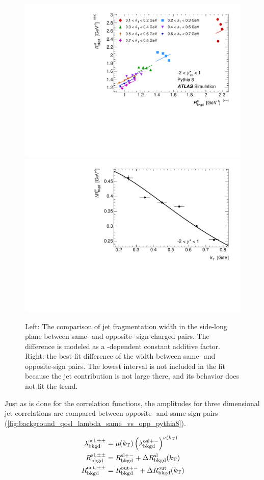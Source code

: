 \begin{figure}[t]
\begin{minipage}[t]{1.0\textwidth}
\centering
\includegraphics[width=.55\linewidth]{can_kt_qosl_backR.pdf}
\includegraphics[width=.44\linewidth]{can_kt_qosl_backR_intercept.pdf}
\end{minipage}
\caption{
  Left: The comparison of jet fragmentation width in the side-long plane between same- and opposite- sign charged pairs. The difference is modeled as a \kt-dependent constant additive factor. Right: the best-fit difference of the width between same- and opposite-sign pairs. The lowest \kt interval is not included in the fit because the jet contribution is not large there, and its behavior does not fit the trend.
}
\label{fig:background_qosl_R_same_vs_opp_pythia8}
\end{figure}


Just as is done for the \qinv correlation functions, the amplitudes for three dimensional jet correlations are compared between opposite- and same-sign pairs (\cref{fig:background_qosl_lambda_same_vs_opp_pythia8}).

\begin{align}
\lambda_{\mathrm{bkgd}}^{\mathrm{osl},\pm\pm} &= \mu(k_\mathrm{T}) \left(\lambda_{\mathrm{bkgd}}^{\mathrm{osl}+-}\right)^{\nu(k_\mathrm{T})} \label{eq:lambdaBackParOSL}\\
R_{\mathrm{bkgd}}^{\mathrm{sl},\pm\pm} &= R_{\mathrm{bkgd}}^{\mathrm{sl}+-} + \Delta R_{\mathrm{bkgd}}^{\mathrm{sl}}(k_\mathrm{T}) \label{eq:rBackParSL}\\
R_{\mathrm{bkgd}}^{\mathrm{out},\pm\pm} &= R_{\mathrm{bkgd}}^{\mathrm{out}+-} + \Delta R_{\mathrm{bkgd}}^{\mathrm{out}}(k_\mathrm{T}) \label{eq:rBackParOut}
\end{align}

